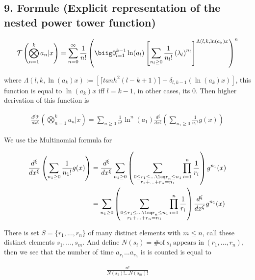 \subsection{9. Formule (Explicit representation of the nested power tower function)}

\begin{align}
        \mathcal{T}\left(\bigotimes_{n=1}^ka_n | x\right) =
        \sum_{n=0}^\infty \frac{1}{n!}\left(\biigO_{l=1}^{k-1}
        \ln(a_l)\left[\sum_{n_l\geq0}\frac{1}{n_l!}\left(
        \lambda_l\right)^{n_l}\right]^{\Lambda(l, k, \ln(a_k)x}\right)^n
\end{align}

where \(\Lambda(l, k, \ln(a_k)x) :=\left[\lceil tanh^2(l-k+1)
\rceil+\delta_{l, k-1}(\ln(a_k)x)\right]\), this function is 
equal to \(\ln(a_k)x\) iff \(l=k-1\), in other cases, its 0.
Then higher derivation of this function is

\begin{align}
        \frac{d^\xi\mathcal{T}}{dx^\xi}\left(\bigotimes_{n=1}^ka_n
        | x\right) = \sum_{n\geq0}\frac{1}{n!}\ln^n(a_1)
        \frac{d^\xi}{dx^\xi}\left(\sum_{n_1\geq0}\frac{1}{n_1!}g(x)\right)
\end{align}

We use the Multinomial formula for

\begin{align}
        \frac{d^\xi}{dx^\xi}\left(\sum_{n_1\geq0}\frac{1}{
        n_1!}g(x)\right) &=  \frac{d^\xi}{dx^\xi} \sum_{n_1
        \geq0} \left(\sum_{\substack{0\leq r_1 \leq...\leqr_n
        \leq n_1 \\ r_1 +...+r_n = n_1}}\prod_{i=1}^n \frac{1}{
        r_i}\right)g^{n_1}(x) \\
        &=\sum_{n_1\geq0} \left(\sum_{\substack{0\leq r_1 \leq.
        ..\leqr_n\leq n_1 \\ r_1 +...+r_n = n_1}}\prod_{i=1}^n 
        \frac{1}{r_i}\right)\frac{d^\xi}{dx^\xi}g^{n_1}(x)
\end{align}

There is set \(S=\{r_1, ..., r_n\}\) of many distinct elements 
with \(m \leq n\), call these distinct elements \(s_1, ..., s_m\).
And define \(N(s_i) = \# \mbox{of} \ s_i \ \mbox{appears in} \ 
(r_1, ..., r_n) \), then we see that the number of time \(a_{r_1}
...a_{r_n}\) is is counted is equal to 

\begin{align}
        \frac{n!}{N(s_1)!...N(s_m)!}
\end{align}

